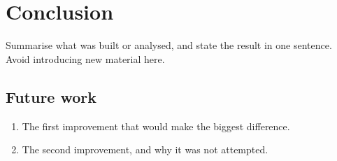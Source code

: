 \section{Conclusion}
\label{sec:conclusion}

Summarise what was built or analysed, and state the result in one sentence.
Avoid introducing new material here.

\subsection{Future work}
\begin{enumerate}
    \item The first improvement that would make the biggest difference.
    \item The second improvement, and why it was not attempted.
\end{enumerate}
